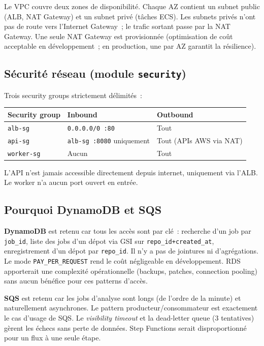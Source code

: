 \documentclass[11pt,a4paper]{article}
\newcommand{\code}[1]{\texttt{#1}}
\begin{document}
Le VPC couvre deux zones de disponibilit\'{e}. Chaque AZ contient un subnet public (ALB, NAT Gateway) et un subnet priv\'{e} (t\^{a}ches ECS). Les subnets priv\'{e}s n'ont pas de route vers l'Internet Gateway~; le trafic sortant passe par la NAT Gateway. Une seule NAT Gateway est provisionn\'{e}e (optimisation de co\^{u}t acceptable en d\'{e}veloppement~; en production, une par AZ garantit la r\'{e}silience).

\subsection{S\'{e}curit\'{e} r\'{e}seau (module \code{security})}

Trois security groups strictement d\'{e}limit\'{e}s~:

\begin{tabularx}{\linewidth}{lXX}
\toprule
Security group & Inbound & Outbound \\
\midrule
\code{alb-sg} & \code{0.0.0.0/0 :80} & Tout \\
\code{api-sg} & \code{alb-sg :8080} uniquement & Tout (APIs AWS via NAT) \\
\code{worker-sg} & Aucun & Tout \\
\bottomrule
\end{tabularx}

L'API n'est jamais accessible directement depuis internet, uniquement via l'ALB. Le worker n'a aucun port ouvert en entr\'{e}e.

\subsection{Pourquoi DynamoDB et SQS}

\textbf{DynamoDB} est retenu car tous les acc\`{e}s sont par cl\'{e}~: recherche d'un job par \code{job\_id}, liste des jobs d'un d\'{e}pot via GSI sur \code{repo\_id+created\_at}, enregistrement d'un d\'{e}pot par \code{repo\_id}. Il n'y a pas de jointures ni d'agr\'{e}gations. Le mode \code{PAY\_PER\_REQUEST} rend le co\^{u}t n\'{e}gligeable en d\'{e}veloppement. RDS apporterait une complexit\'{e} op\'{e}rationnelle (backups, patches, connection pooling) sans aucun b\'{e}n\'{e}fice pour ces patterns d'acc\`{e}s.

\textbf{SQS} est retenu car les jobs d'analyse sont longs (de l'ordre de la minute) et naturellement asynchrones. Le pattern producteur/consommateur est exactement le cas d'usage de SQS. Le \textit{visibility timeout} et la dead-letter queue (3 tentatives) g\`{e}rent les \'{e}checs sans perte de donn\'{e}es. Step Functions serait disproportionn\'{e} pour un flux \`{a} une seule \'{e}tape.
\end{document}
